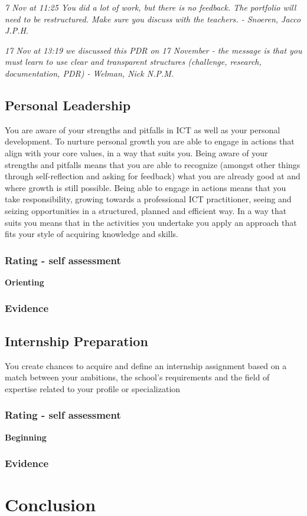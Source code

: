 \documentclass[a4paper, 11pt]{article}
\begin{document}
\begin{mdframed}[backgroundcolor=gray!20, linecolor=black, linewidth=0pt, leftmargin=1cm, rightmargin=1cm, innertopmargin=10pt, innerbottommargin=10pt]
  \itshape
  7 Nov at 11:25 \smallbreak
  You did a lot of work, but there is no feedback. The portfolio will need to be restructured. Make sure you discuss with the teachers.\smallbreak
- Snoeren, Jacco J.P.H.
\end{mdframed}

\begin{mdframed}[backgroundcolor=gray!20, linecolor=black, linewidth=0pt, leftmargin=1cm, rightmargin=1cm, innertopmargin=10pt, innerbottommargin=10pt]
  \itshape
  17 Nov at 13:19 \smallbreak
  we discussed this PDR on 17 November - the message is that you must learn to use clear and transparent structures (challenge, research, documentation, PDR)\smallbreak
- Welman, Nick N.P.M.
\end{mdframed}

\subsection{Personal Leadership}
You are aware of your strengths and pitfalls in ICT as well as your personal development. To nurture personal growth you are able to engage in actions that align with your core values, in a way that suits you.
\medbreak
Being aware of your strengths and pitfalls means that you are able to recognize (amongst other things through self-reflection and asking for feedback) what you are already good at and where growth is still possible.   Being able to engage in actions means that you take responsibility, growing towards a professional ICT practitioner, seeing and seizing opportunities in a structured, planned and efficient way. In a way that suits you means that in the activities you undertake you apply an approach that fits your style of acquiring knowledge and skills. 

\pagebreak



\subsubsection{Rating - self assessment}
\textbf{Orienting} 
\subsubsection{Evidence}

\subsection{Internship Preparation}
You create chances to acquire and define an internship assignment based on a match between your ambitions, the school's requirements and the field of expertise related to your profile or specialization

\subsubsection{Rating - self assessment}
\textbf{Beginning} 
\subsubsection{Evidence}



\section{Conclusion}
\end{document}
